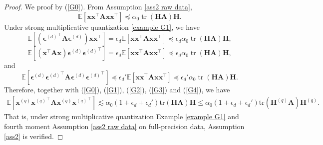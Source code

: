 \documentclass[11pt, letterpaper]{article}
\begin{document}
\begin{proof}
    We proof by (\ref{G0}).
    From Assumption \ref{ass2 raw data},
    \begin{equation}
        \label{G1}
        \mathbb{E}\left[{\mathbf{x}}{\mathbf{x}}^\top\mathbf{A}{\mathbf{x}}{\mathbf{x}}^\top\right]\preceq\alpha_0\operatorname{tr}(\mathbf{H}\mathbf{A})\mathbf{H}.
    \end{equation}
    Under strong multiplicative quantization \ref{example G1}, we have
    \begin{equation}
        \label{G2}
        \mathbb{E}\left[\left({\boldsymbol{\epsilon}^{(d)}}^\top\mathbf{A}{\boldsymbol{\epsilon}^{(d)}}\right){\mathbf{x}}{\mathbf{x}}^\top\right]=\epsilon_d\mathbb{E}\left[{\mathbf{x}}{\mathbf{x}}^\top\mathbf{A}{\mathbf{x}}{\mathbf{x}}^\top\right]\preceq\epsilon_d\alpha_0\operatorname{tr}(\mathbf{H}\mathbf{A})\mathbf{H},
    \end{equation}
    \begin{equation}
        \label{G3}
        \mathbb{E}\left[\left({\mathbf{x}}^\top\mathbf{A}{\mathbf{x}}\right)\boldsymbol{\epsilon}^{(d)}{\boldsymbol{\epsilon}^{(d)}}^\top\right]=\epsilon_d\mathbb{E}\left[{\mathbf{x}}{\mathbf{x}}^\top\mathbf{A}{\mathbf{x}}{\mathbf{x}}^\top\right]\preceq\epsilon_d\alpha_0\operatorname{tr}(\mathbf{H}\mathbf{A})\mathbf{H},
    \end{equation}
    and
    \begin{equation}
        \label{G4}
        \mathbb{E}\left[\boldsymbol{\epsilon}^{(d)}{\boldsymbol{\epsilon}^{(d)}}^\top\mathbf{A}\boldsymbol{\epsilon}^{(d)}{\boldsymbol{\epsilon}^{(d)}}^\top\right]\preceq\epsilon_d'\mathbb{E}\left[{\mathbf{x}}{\mathbf{x}}^\top\mathbf{A}{\mathbf{x}}{\mathbf{x}}^\top\right]\preceq\epsilon_d'\alpha_0\operatorname{tr}(\mathbf{H}\mathbf{A})\mathbf{H}.
    \end{equation}
    Therefore, together with (\ref{G0}), (\ref{G1}), (\ref{G2}), (\ref{G3}) and (\ref{G4}), we have
    \begin{equation*}
        \begin{aligned}
            \mathbb{E}\left[{\mathbf{x}^{(q)}}{\mathbf{x}^{(q)}}^\top\mathbf{A}{\mathbf{x}^{(q)}}{\mathbf{x}^{(q)}}^\top\right]\lesssim\alpha_0(1+\epsilon_d+\epsilon_d')\mathrm{tr}(\mathbf{H}\mathbf{A})\mathbf{H}\leq\alpha_0{(1+\epsilon_d+\epsilon_d')}\mathrm{tr}(\mathbf{H}^{(q)}\mathbf{A})\mathbf{H}^{(q)}.
        \end{aligned}
    \end{equation*}
    That is, under strong multiplicative quantization Example \ref{example G1} and fourth moment Assumption \ref{ass2 raw data} on full-precision data, Assumption \ref{ass2} is verified.
\end{proof}
\end{document}

